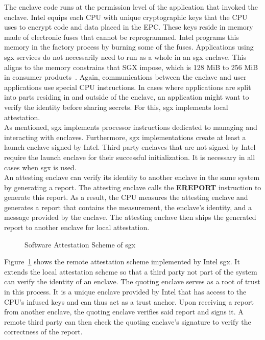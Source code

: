 The enclave code runs at the permission level of the application that invoked
the enclave. Intel equips each CPU with unique cryptographic keys that the CPU
uses to encrypt code and data placed in the EPC. These keys reside in memory
made of electronic fuses that cannot be reprogrammed. Intel programs this memory
in the factory process by burning some of the fuses. Applications using
\gls{sgx} services do not necessarily need to run as a whole in an \gls{sgx}
enclave. This aligns to the memory constrains that SGX impose, which is 128 MiB
to 256 MiB in consumer products~\cite{enclave_size}. Again, communications
between the enclave and user applications use special CPU instructions. In cases
where applications are split into parts residing in and outside of the enclave,
an application might want to verify the identity before sharing secrets. For
this, \gls{sgx} implements local attestation.\\

As mentioned, \gls{sgx} implements processor instructions dedicated to managing
and interacting with enclaves. Furthermore, \gls{sgx} implementations create at
least a launch enclave signed by Intel. Third party enclaves that are not signed
by Intel require the launch enclave for their successful initialization. It is
necessary in all cases when \gls{sgx} is used.\\

An attesting enclave can verify its identity to another enclave in the same
system by generating a report. The attesting enclave calls the \textbf{EREPORT}
instruction to generate this report. As a result, the CPU measures the attesting
enclave and generates a report that contains the measurement, the enclave's
identity, and a message provided by the enclave. The attesting enclave then
ships the generated report to another enclave for local attestation.
\begin{center}
  \begin{figure}
    \centering
    
    \caption{Software Attestation Scheme of \gls{sgx}}
    \label{fig:state:tee:sgx_attestation}
  \end{figure}
\end{center}
Figure~\ref{fig:state:tee:sgx_attestation} shows the remote attestation scheme
implemented by Intel \gls{sgx}. It extends the local attestation scheme so that
a third party not part of the system can verify the identity of an enclave. The
quoting enclave serves as a root of trust in this process. It is a unique
enclave provided by Intel that has access to the CPU's infused keys and can thus
act as a trust anchor. Upon receiving a report from another enclave, the quoting
enclave verifies said report and signs it. A remote third party can then check
the quoting enclave's signature to verify the correctness of the report.

